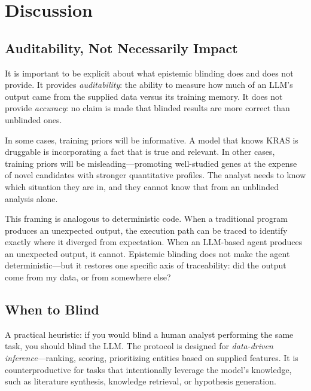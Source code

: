 \documentclass[sigconf, nonacm]{acmart}
\begin{document}
\section{Discussion}

\subsection{Auditability, Not Necessarily Impact}

It is important to be explicit about what epistemic blinding does and does not provide. It provides \textit{auditability}: the ability to measure how much of an LLM's output came from the supplied data versus its training memory. It does not provide \textit{accuracy}: no claim is made that blinded results are more correct than unblinded ones.

In some cases, training priors will be informative. A model that knows KRAS is druggable is incorporating a fact that is true and relevant. In other cases, training priors will be misleading---promoting well-studied genes at the expense of novel candidates with stronger quantitative profiles. The analyst needs to know which situation they are in, and they cannot know that from an unblinded analysis alone.

This framing is analogous to deterministic code. When a traditional program produces an unexpected output, the execution path can be traced to identify exactly where it diverged from expectation. When an LLM-based agent produces an unexpected output, it cannot. Epistemic blinding does not make the agent deterministic---but it restores one specific axis of traceability: did the output come from my data, or from somewhere else?

\subsection{When to Blind}

A practical heuristic: if you would blind a human analyst performing the same task, you should blind the LLM. The protocol is designed for \textit{data-driven inference}---ranking, scoring, prioritizing entities based on supplied features. It is counterproductive for tasks that intentionally leverage the model's knowledge, such as literature synthesis, knowledge retrieval, or hypothesis generation.
\end{document}
